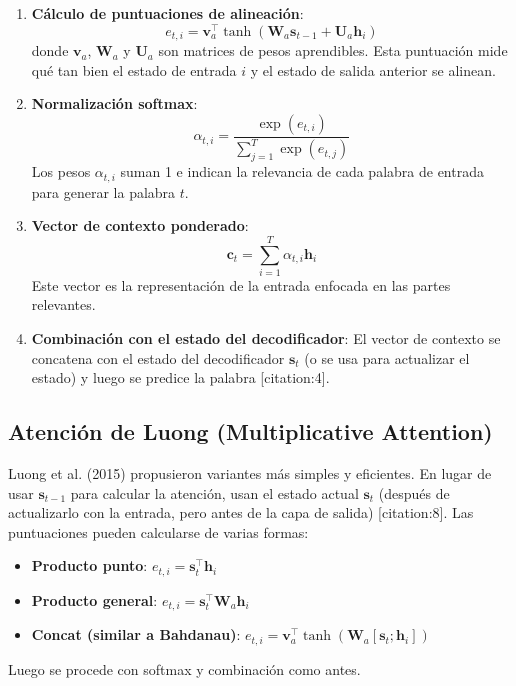 \documentclass[12pt,a4paper,openany,oneside]{book}
\begin{document}
\begin{enumerate}
    \item \textbf{Cálculo de puntuaciones de alineación}:
    \[
    e_{t,i} = \mathbf{v}_a^\top \tanh(\mathbf{W}_a \mathbf{s}_{t-1} + \mathbf{U}_a \mathbf{h}_i)
    \]
    donde \(\mathbf{v}_a\), \(\mathbf{W}_a\) y \(\mathbf{U}_a\) son matrices de pesos aprendibles. Esta puntuación mide qué tan bien el estado de entrada \(i\) y el estado de salida anterior se alinean.
    
    \item \textbf{Normalización softmax}:
    \[
    \alpha_{t,i} = \frac{\exp(e_{t,i})}{\sum_{j=1}^T \exp(e_{t,j})}
    \]
    Los pesos \(\alpha_{t,i}\) suman 1 e indican la relevancia de cada palabra de entrada para generar la palabra \(t\).
    
    \item \textbf{Vector de contexto ponderado}:
    \[
    \mathbf{c}_t = \sum_{i=1}^T \alpha_{t,i} \mathbf{h}_i
    \]
    Este vector es la representación de la entrada enfocada en las partes relevantes.
    
    \item \textbf{Combinación con el estado del decodificador}:
    El vector de contexto se concatena con el estado del decodificador \(\mathbf{s}_t\) (o se usa para actualizar el estado) y luego se predice la palabra [citation:4].
\end{enumerate}

\subsection{Atención de Luong (Multiplicative Attention)}
Luong et al. (2015) propusieron variantes más simples y eficientes. En lugar de usar \(\mathbf{s}_{t-1}\) para calcular la atención, usan el estado actual \(\mathbf{s}_t\) (después de actualizarlo con la entrada, pero antes de la capa de salida) [citation:8]. Las puntuaciones pueden calcularse de varias formas:
\begin{itemize}
    \item \textbf{Producto punto}: \(e_{t,i} = \mathbf{s}_t^\top \mathbf{h}_i\)
    \item \textbf{Producto general}: \(e_{t,i} = \mathbf{s}_t^\top \mathbf{W}_a \mathbf{h}_i\)
    \item \textbf{Concat (similar a Bahdanau)}: \(e_{t,i} = \mathbf{v}_a^\top \tanh(\mathbf{W}_a [\mathbf{s}_t; \mathbf{h}_i])\)
\end{itemize}
Luego se procede con softmax y combinación como antes.
\end{document}
